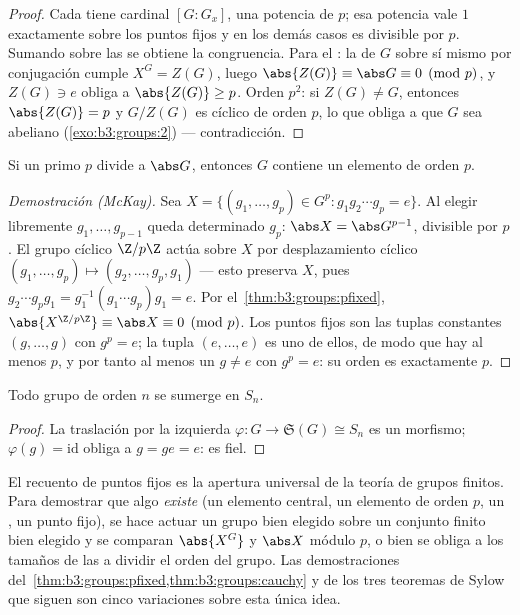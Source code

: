 \begin{proof}
Cada  tiene cardinal $[G:G_x]$, una
potencia de $p$; esa potencia vale $1$ exactamente sobre los puntos
fijos y en los demás casos es divisible por $p$. Sumando sobre las
 se obtiene la congruencia. Para
el : la
 de $G$ sobre sí mismo por
conjugación cumple $X^G = Z(G)$, luego $\abs{Z(G)} \equiv
\abs G \equiv 0 \pmod p$, y $Z(G) \ni e$ obliga a $\abs{Z(G)} \geq
p$. Orden $p^2$: si $Z(G) \neq G$, entonces $\abs{Z(G)} = p$ y $G/Z(G)$
es cíclico de orden $p$, lo que obliga a que $G$ sea abeliano
(\cref{exo:b3:groups:2}) --- contradicción.
\end{proof}

\begin{theorem}[Cauchy]\label{thm:b3:groups:cauchy}
Si un primo $p$ divide a $\abs G$, entonces $G$ contiene un elemento de
orden $p$.
\end{theorem}

\begin{proof}[Demostración (McKay)]
Sea $X = \{(g_1, \dots, g_p) \in G^p : g_1 g_2 \cdots g_p = e\}$. Al
elegir libremente $g_1, \dots, g_{p-1}$ queda determinado $g_p$:
$\abs X =
\abs G^{p-1}$, divisible por $p$. El grupo cíclico $\Z/p\Z$ actúa sobre
$X$ por desplazamiento cíclico
$(g_1, \dots, g_p) \mapsto (g_2, \dots, g_p,
g_1)$ --- esto preserva $X$, pues $g_2 \cdots g_p g_1 =
g_1^{-1}(g_1 \cdots g_p)g_1 = e$. Por el~\cref{thm:b3:groups:pfixed},
$\abs{X^{\Z/p\Z}} \equiv \abs X \equiv 0 \pmod p$. Los puntos fijos son
las tuplas constantes $(g, \dots, g)$ con $g^p = e$; la tupla $(e,
\dots, e)$ es uno de ellos, de modo que hay al menos $p$, y por tanto al
menos un $g \neq e$ con $g^p = e$: su orden es exactamente $p$.
\end{proof}

\begin{theorem}[Cayley]\label{thm:b3:groups:cayley}
Todo grupo de orden $n$ se sumerge en $S_n$.
\end{theorem}

\begin{proof}
La traslación por la izquierda
$\varphi \colon G \to \mathfrak S(G) \cong S_n$ es un morfismo;
$\varphi(g) = \mathrm{id}$ obliga a $g = ge = e$: es fiel.
\end{proof}

\begin{method}\label{met:b3:groups:counting}
El recuento de puntos fijos es la apertura universal de la teoría de
grupos finitos. Para demostrar que algo \emph{existe} (un elemento
central, un elemento de orden $p$, un
, un punto fijo), se hace
actuar un grupo bien elegido sobre un conjunto finito bien elegido y se
comparan $\abs{X^G}$ y $\abs X$ módulo $p$, o bien se obliga a los
tamaños de las  a dividir el orden
del grupo. Las demostraciones
del~\cref{thm:b3:groups:pfixed,thm:b3:groups:cauchy} y de los tres
teoremas de Sylow que siguen son cinco variaciones sobre esta única
idea.
\end{method}

